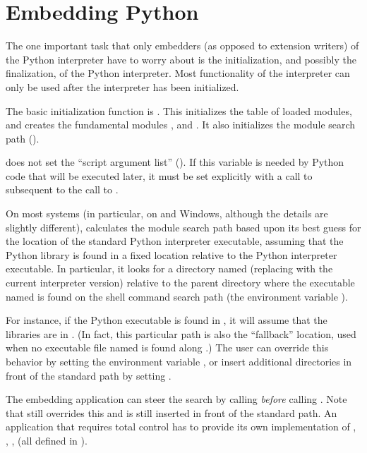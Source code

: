 \documentclass{manual}
\begin{document}
\section{Embedding Python \label{embedding}}

The one important task that only embedders (as opposed to extension
writers) of the Python interpreter have to worry about is the
initialization, and possibly the finalization, of the Python
interpreter.  Most functionality of the interpreter can only be used
after the interpreter has been initialized.

The basic initialization function is .
This initializes the table of loaded modules, and creates the
fundamental modules ,
 and 
.  It also initializes the module
search path ().%

 does not set the ``script argument list'' 
().  If this variable is needed by Python code that 
will be executed later, it must be set explicitly with a call to 
 subsequent to the call 
to .

On most systems (in particular, on \UNIX{} and Windows, although the
details are slightly different), 
calculates the module search path based upon its best guess for the
location of the standard Python interpreter executable, assuming that
the Python library is found in a fixed location relative to the Python
interpreter executable.  In particular, it looks for a directory named
 (replacing  with the current
interpreter version) relative to the parent directory where the
executable named  is found on the shell command search
path (the environment variable ).

For instance, if the Python executable is found in
, it will assume that the libraries are in
.  (In fact, this particular path
is also the ``fallback'' location, used when no executable file named
 is found along .)  The user can override
this behavior by setting the environment variable ,
or insert additional directories in front of the standard path by
setting .

The embedding application can steer the search by calling 
 \emph{before} calling 
.  Note that  still
overrides this and  is still inserted in front of
the standard path.  An application that requires total control has to
provide its own implementation of ,
, ,
 (all defined in
).
\end{document}
